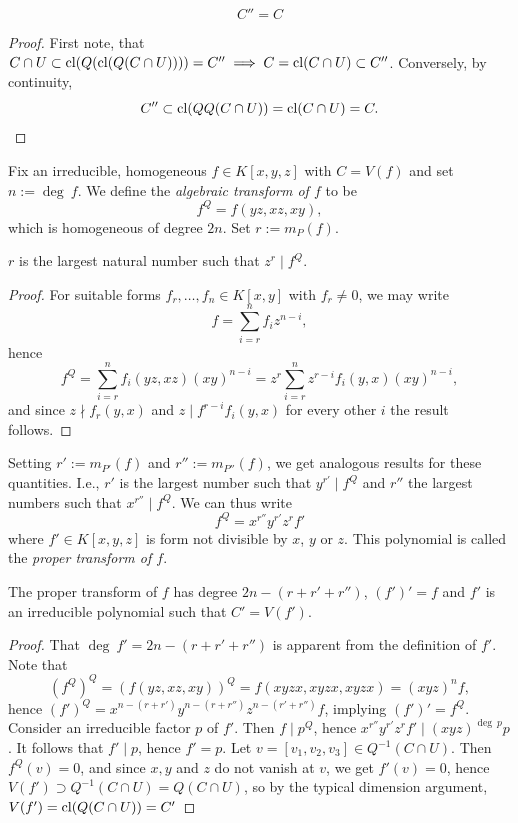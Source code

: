     \begin{lemma}
        $$
            C'' = C
        $$
    \end{lemma}
    \begin{proof}
        First note, that 
        $C\cap U \subset \mathrm{cl}(Q(\mathrm{cl}(Q(C\cap U)))) = C''\implies C=\mathrm{cl}(C\cap U) \subset C''$. Conversely, by continuity, 
        $$
            C'' \subset \mathrm{cl}(QQ(C\cap U )) = \mathrm{cl}(C\cap U)=C.
        $$
    \end{proof}
    Fix an irreducible, homogeneous $f\in K[x,y,z]$ with $C=V(f)$ and set $n:= \deg \ f$. We define the \emph{algebraic transform of $f$} to be 
    $$
        f^Q = f(yz,xz,xy),
    $$ 
    which is homogeneous of degree $2n$. Set $r := m_P(f)$.
    \begin{lemma}
        $r$ is the largest natural number such that $z^r\mid f^Q$. 
    \end{lemma}
    \begin{proof}
        For suitable forms $f_r,\dots, f_n\in K[x,y]$ with $f_r\neq 0$, we may write 
        $$
            f = \sum_{i=r}^n f_i z^{n-i},
        $$
        hence 
        $$
            f^Q =\sum_{i=r}^n f_i(yz,xz)(xy)^{n-i} = z^r \sum_{i=r}^n z^{r-i}f_i(y,x)(xy)^{n-i},
        $$
        and since $z\nmid f_r(y,x)$ and $z\mid f^{r-i}f_i(y,x)$ for every other $i$ the result follows. 
    \end{proof}
    Setting $r' := m_{P'}(f)$ and $r'' := m_{P''}(f)$, we get analogous results for these quantities. I.e., $r'$ is the largest number such that $y^{r'}\mid f^Q$ and $r''$ the largest numbers such that $x^{r''}\mid f^Q$. We can thus write 
        $$
            f^Q = x^{r''}y^{r'}z^rf'
        $$
        where $f'\in K[x,y,z]$ is form not divisible by $x$, $y$ or $z$. This polynomial is called the \emph{proper transform of $f$}. 
    \begin{lemma}
        The proper transform of $f$ has degree $2n-(r+r'+r'')$, $(f')'=f$ and $f'$ is an irreducible polynomial such that $C' = V(f')$. 
    \end{lemma}
    \begin{proof}
        That $\deg\ f' = 2n-(r+r'+r'')$ is apparent from the definition of $f'$. Note that 
        $$
            (f^Q)^Q = (f(yz,xz,xy))^Q= f(xyzx,xyzx,xyzx)=(xyz)^nf,   
        $$
        hence $(f')^Q = x^{n-(r+r')}y^{n-(r+r'')}z^{n-(r'+r'')}f$, implying $(f')' = f^Q$. Consider an irreducible factor $p$ of $f'$. Then $f\mid p^Q$, hence $x^{r''}y^{r'}z^rf'\mid (xyz)^{\deg \ p} p$. It follows that $f'\mid p$, hence $f' = p$. Let $v=[v_1,v_2,v_3]\in Q^{-1}(C\cap U)$. Then $f^Q(v)= 0$, and since $x,y$ and $z$ do not vanish at $v$, we get $f'(v)=0$, hence $V(f')\supset Q^{-1}(C\cap U)=Q(C\cap U)$, so by the typical dimension argument, $V(f')=\mathrm{cl}(Q(C\cap U))=C'$ 
    \end{proof}
